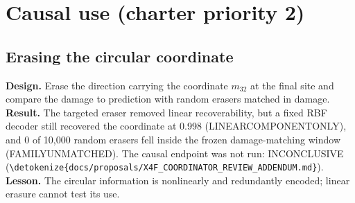 \documentclass[11pt,a4paper]{article}
\DeclareRobustCommand{\_}{\ifmmode\origunderscore\else\textunderscore\allowbreak\fi}
\DeclareRobustCommand{\fpath}[1]{\begingroup\small\expandafter\nolinkurl\expandafter{\detokenize{#1}}\endgroup}
\begin{document}
\section{Causal use (charter priority 2)}\label{sec:causal}

\subsection{Erasing the circular coordinate}
\textbf{Design.} Erase the direction carrying the coordinate $m_{32}$ at the final site and compare
the damage to prediction with random erasers matched in damage. \textbf{Result.} The targeted eraser
removed linear recoverability, but a fixed RBF decoder still recovered the coordinate at 0.998
(LINEAR\_COMPONENT\_ONLY), and 0 of 10,000 random erasers fell inside the frozen damage-matching
window (FAMILY\_UNMATCHED). The causal endpoint was not run: INCONCLUSIVE
(\fpath{docs/proposals/X4F_COORDINATOR_REVIEW_ADDENDUM.md}). \textbf{Lesson.} The circular information is
nonlinearly and redundantly encoded; linear erasure cannot test its use.
\end{document}
